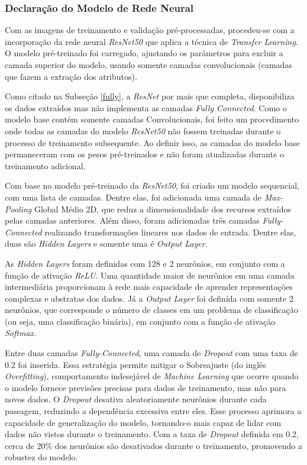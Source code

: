 
\subsubsection{\esp Declaração do Modelo de Rede Neural} \label{camadas}

Com as imagens de treinamento e validação pré-processadas, procedeu-se com a incorporação da rede neural \textit{ResNet50} que aplica a técnica de \textit{Transfer Learning}. O modelo pré-treinado foi carregado, ajustando os parâmetros para excluir a camada superior do modelo, usando somente camadas convolucionais (camadas que fazem a extração dos atributos).

Como citado na Subseção \ref{fully}, a \textit{ResNet} por mais que completa, disponibiliza os dados extraídos mas não implementa as camadas \textit{Fully Connected}. Como o modelo base contém somente camadas Convolucionais, foi feito um procedimento onde todas as camadas do modelo \textit{ResNet50} não fossem treinadas durante o processo de treinamento subsequente. Ao definir isso, as camadas do modelo base permaneceram com os pesos pré-treinados e não foram atualizadas durante o treinamento adicional. 

Com base no modelo pré-treinado da \textit{ResNet50}, foi criado um modelo sequencial, com uma lista de camadas. Dentre elas, foi adicionada uma camada de \textit{Max-Pooling} Global Médio 2D, que reduz a dimensionalidade dos recursos extraídos pelas camadas anteriores. Além disso, foram adicionadas três camadas \textit{Fully-Connected} realizando transformações lineares nos dados de entrada. Dentre elas, duas são \textit{Hidden Layers} e somente uma é \textit{Output Layer}.

As \textit{Hidden Layers} foram definidas com 128 e 2 neurônios, em conjunto com a função de ativação \textit{ReLU}. Uma quantidade maior de neurônios em uma camada intermediária proporcionam à rede mais capacidade de aprender representações complexas e abstratas dos dados. Já a \textit{Output Layer} foi definida com somente 2 neurônios, que corresponde o número de classes em um problema de classificação (ou seja, uma classificação binária), em conjunto com a função de ativação \textit{Softmax}.

Entre duas camadas \textit{Fully-Connected}, uma camada de \textit{Dropout} com uma taxa de 0.2 foi inserida. Essa estratégia permite mitigar o Sobreajuste (do inglês \textit{Overfitting}), comportamento indesejável de \textit{Machine Learning} que ocorre quando o modelo fornece previsões precisas para dados de treinamento, mas não para novos dados. O \textit{Dropout} desativa aleatoriamente neurônios durante cada passagem, reduzindo a dependência excessiva entre eles. Esse processo aprimora a capacidade de generalização do modelo, tornando-o mais capaz de lidar com dados não vistos durante o treinamento. Com a taxa de \textit{Dropout} definida em 0.2, cerca de 20\% dos neurônios são desativados durante o treinamento, promovendo a robustez do modelo.



